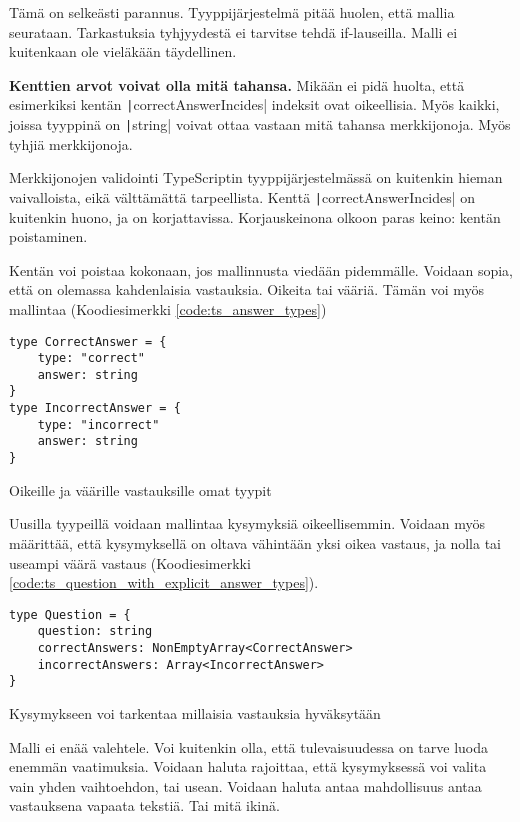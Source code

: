 Tämä on selkeästi parannus. Tyyppijärjestelmä pitää huolen, että mallia seurataan. Tarkastuksia tyhjyydestä ei tarvitse tehdä if-lauseilla. Malli ei kuitenkaan ole vieläkään täydellinen.

\textbf{Kenttien arvot voivat olla mitä tahansa.} Mikään ei pidä huolta, että esimerkiksi kentän \texttt|correctAnswerIncides| indeksit ovat oikeellisia. Myös kaikki, joissa tyyppinä on \texttt|string| voivat ottaa vastaan mitä tahansa merkkijonoja. Myös tyhjiä merkkijonoja.

Merkkijonojen validointi TypeScriptin tyyppijärjestelmässä on kuitenkin hieman vaivalloista, eikä välttämättä tarpeellista. Kenttä \texttt|correctAnswerIncides| on kuitenkin huono, ja on korjattavissa. Korjauskeinona olkoon paras keino: kentän poistaminen.

Kentän voi poistaa kokonaan, jos mallinnusta viedään pidemmälle. Voidaan sopia, että on olemassa kahdenlaisia vastauksia. Oikeita tai vääriä. Tämän voi myös mallintaa (Koodiesimerkki \ref{code:ts_answer_types})

\begin{code}
    \begin{verbatim}
type CorrectAnswer = {
    type: "correct"
    answer: string
}
type IncorrectAnswer = {
    type: "incorrect"
    answer: string
}
    \end{verbatim}
    \caption{Oikeille ja väärille vastauksille omat tyypit}
    \label{code:ts_answer_types}
\end{code}

Uusilla tyypeillä voidaan mallintaa kysymyksiä oikeellisemmin. Voidaan myös määrittää, että kysymyksellä on oltava vähintään yksi oikea vastaus, ja nolla tai useampi väärä vastaus (Koodiesimerkki \ref{code:ts_question_with_explicit_answer_types}).

\begin{code}
    \begin{verbatim}
type Question = {
    question: string
    correctAnswers: NonEmptyArray<CorrectAnswer>
    incorrectAnswers: Array<IncorrectAnswer>
}
    \end{verbatim}
    \caption{Kysymykseen voi tarkentaa millaisia vastauksia hyväksytään}
    \label{code:ts_question_with_explicit_answer_types}
\end{code}

Malli ei enää valehtele. Voi kuitenkin olla, että tulevaisuudessa on tarve luoda enemmän vaatimuksia. Voidaan haluta rajoittaa, että kysymyksessä voi valita vain yhden vaihtoehdon, tai usean. Voidaan haluta antaa mahdollisuus antaa vastauksena vapaata tekstiä. Tai mitä ikinä.

